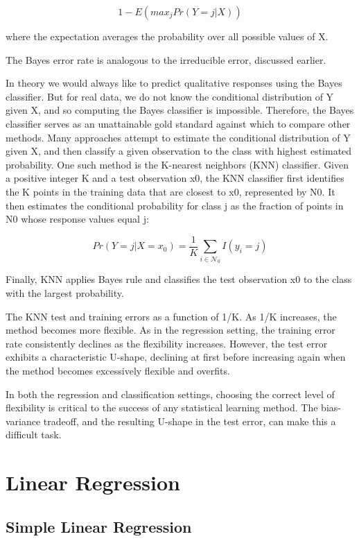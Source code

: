 \documentclass{article}
\theoremstyle{definition}
\theoremstyle{remark}
\begin{document}
	\[
	1-E(max_jPr(Y=j|X))
	\]
	
	where the expectation averages the probability over all possible values of X.
	
	The Bayes error rate is analogous to the irreducible error, discussed earlier.
	
	In theory we would always like to predict qualitative responses using the Bayes classifier. But for real data, we do not know the conditional distribution of Y given X, and so computing the Bayes classifier is impossible. Therefore, the Bayes classifier serves as an unattainable gold standard against which to compare other methods. Many approaches attempt to estimate the conditional distribution of Y given X, and then classify a given observation to the class with highest estimated probability. One such method is the K-nearest neighbors (KNN) classifier. Given a positive integer K and a test observation x0, the KNN classifier first identifies the K points in the training data that are closest to x0, represented by N0. It then estimates the conditional probability for class j as the fraction of points in N0 whose response values equal j:
	
	\[
	Pr(Y=j|X=x_0)=\frac{1}{K}\sum_{i\in \mathcal{N}_0}I(y_i=j)
	\]
	
	Finally, KNN applies Bayes rule and classifies the test observation x0 to the class with the largest probability.
	
	The KNN test and training errors as a function of 1/K. As 1/K increases, the method becomes more flexible. As in the regression setting, the training error rate consistently declines as the flexibility increases. However, the test error exhibits a characteristic U-shape, declining at first before increasing again when the method becomes excessively flexible and overfits.
	
	\hspace{\fill}
	
	In both the regression and classification settings, choosing the correct level of flexibility is critical to the success of any statistical learning method. The bias-variance tradeoff, and the resulting U-shape in the test error, can make this a difficult task.
	
	\section*{Linear Regression}
	
	\subsection*{Simple Linear Regression}
	
\end{document}
